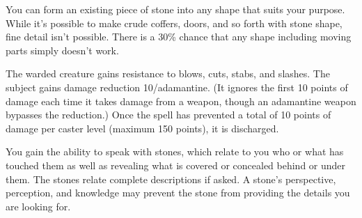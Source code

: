 \begin{multicols}{2}
\begin{small}
\noindent You can form an existing piece of stone into any shape that suits your purpose. While it's possible to make crude coffers, doors, and so forth with stone shape, fine detail isn't possible. There is a 30\% chance that any shape including moving parts simply doesn't work.


\noindent The warded creature gains resistance to blows, cuts, stabs, and slashes. The subject gains damage reduction 10/adamantine. (It ignores the first 10 points of damage each time it takes damage from a weapon, though an adamantine weapon bypasses the reduction.) Once the spell has prevented a total of 10 points of damage per caster level (maximum 150 points), it is discharged.


\noindent You gain the ability to speak with stones, which relate to you who or what has touched them as well as revealing what is covered or concealed behind or under them. The stones relate complete descriptions if asked. A stone's perspective, perception, and knowledge may prevent the stone from providing the details you are looking for.


\end{small}
\end{multicols}
